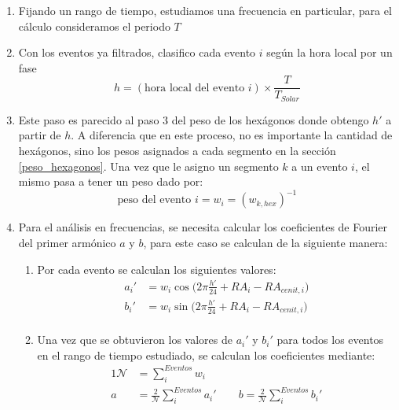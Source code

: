             \begin{enumerate}
        \item Fijando un rango de tiempo, estudiamos una frecuencia en particular, para el cálculo consideramos el periodo $T$
        \item Con los eventos ya filtrados, clasifico cada evento $i$ según la hora local por un fase
        \begin{equation*}
          h = (\text{hora local del evento } i)\times \frac{T}{T_{Solar}}
        \end{equation*}
        \item Este paso es parecido al paso $3$ del peso de los hexágonos donde obtengo $h'$ a partir de $h$. A diferencia que en este proceso, no es importante la cantidad de hexágonos, sino los pesos asignados a cada segmento en  la sección \ref{peso_hexagonos}. Una vez que le asigno un segmento $k$ a un evento $i$, el mismo pasa a tener un peso dado por:
        \begin{equation*}
          \text{peso del evento } i = w_{i}= (w_{k, hex})^{-1}
          \end{equation*} 
         
        \item Para el análisis en frecuencias, se necesita calcular los coeficientes de Fourier del primer armónico $a$ y $b$, para este caso se calculan de la siguiente manera:

        \begin{enumerate}
          \item Por cada evento se calculan los siguientes valores:
          \begin{align}
             a_i' &= {w_i}\cos\Big(2\pi \frac{h'}{24} + RA_i -RA_{cenit,i}\Big)\\
             b_i' &= {w_i}\sin\Big(2\pi \frac{h'}{24} + RA_i -RA_{cenit,i}\Big)\\
         \end{align}
         
         \item Una vez que se obtuvieron los valores de $a_i'$ y $b_i'$ para todos los eventos en el rango de tiempo estudiado, se calculan los coeficientes mediante:
         \begin{alignat}{1}
          \mathcal{N} &= \sum^{Eventos}_i w_i\\ 
            a &= \frac{2}{\mathcal{N}} \sum^{Eventos}_i a_i' \qquad
            b = \frac{2}{\mathcal{N}} \sum^{Eventos}_i b_i'  
         \end{alignat}
        \end{enumerate}


\end{enumerate}
